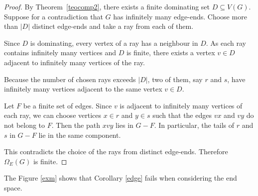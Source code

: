 \documentclass{amsart}
\theoremstyle{definition}
\theoremstyle{remark}
\numberwithin{equation}{section}
\begin{document}
\begin{proof}
	By Theorem~\ref{teocomp2}, there exists a finite dominating set
	$D\subseteq V(G)$. Suppose for a contradiction that $G$ has infinitely
	many edge-ends. Choose more than $|D|$ distinct edge-ends and take a
	ray from each of them.
	
	Since $D$ is dominating, every vertex of a ray has a neighbour in $D$.
	As each ray contains infinitely many vertices and $D$ is finite, there
	exists a vertex $v\in D$ adjacent to infinitely many vertices of the ray.
	
	Because the number of chosen rays exceeds $|D|$, two of them,
	say $r$ and $s$, have infinitely many vertices adjacent to the
	same vertex $v\in D$.
	
	Let $F$ be a finite set of edges. Since $v$ is adjacent to infinitely
	many vertices of each ray, we can choose vertices $x\in r$ and
	$y\in s$ such that the edges $vx$ and $vy$ do not belong to $F$.
	Then the path $xvy$ lies in $G-F$. In particular, the tails of
	$r$ and $s$ in $G-F$ lie in the same component.
	
	This contradicts the choice of the rays from distinct edge-ends.
	Therefore $\Omega_E(G)$ is finite.
\end{proof}

The Figure \ref{exm} shows that Corollary \ref{edge} fails when considering the end space.
\end{document}
